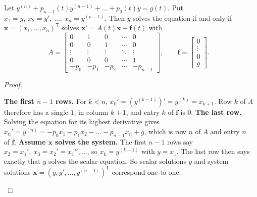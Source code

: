 \documentclass[10pt]{scrartcl}
\newcommand{\vv}[1]{\mathbf{#1}}
\begin{document}
\begin{proposition*}
  Let $y^{(n)}+p_{n-1}(t)y^{(n-1)}+\dots+p_0(t)y=g(t)$. Put $x_1=y,\ x_2=y',\ \dots,\ x_n=y^{(n-1)}$. Then $y$ solves the equation if and only if $\vv x=(x_1,\dots,x_n)^{\mathsf T}$ solves $\vv x'=A(t)\vv x+\vv f(t)$ with
  \[
    A = \begin{bmatrix}0&1&0&\cdots&0\\0&0&1&\cdots&0\\\vdots&\vdots&\vdots&\ddots&\vdots\\0&0&0&\cdots&1\\-p_0&-p_1&-p_2&\cdots&-p_{n-1}\end{bmatrix},\qquad
    \vv f = \begin{bmatrix}0\\\vdots\\0\\g\end{bmatrix}.
  \]
\end{proposition*}
\begin{proof}
  \begin{steps}
    \ii \textbf{The first $n-1$ rows.} For $k<n$, $x_k'=(y^{(k-1)})'=y^{(k)}=x_{k+1}$. Row $k$ of $A$ therefore has a single $1$, in column $k+1$, and entry $k$ of $\vv f$ is $0$.
    \ii \textbf{The last row.} Solving the equation for its highest derivative gives $x_n'=y^{(n)}=-p_0x_1-p_1x_2-\dots-p_{n-1}x_n+g$, which is row $n$ of $A$ and entry $n$ of $\vv f$.
    \ii \textbf{Assume $\vv x$ solves the system.} The first $n-1$ rows say $x_2=x_1',\ x_3=x_2'=x_1'',\dots$, so $x_k=y^{(k-1)}$ with $y=x_1$. The last row then says exactly that $y$ solves the scalar equation. So scalar solutions $y$ and system solutions $\vv x=(y,y',\dots,y^{(n-1)})^{\mathsf T}$ correspond one-to-one. \qedhere
  \end{steps}
\end{proof}

\begin{fig}
\end{fig}
\end{document}
